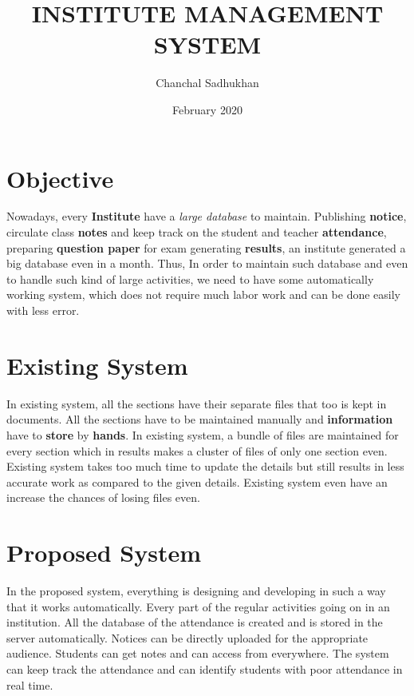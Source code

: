 \documentclass[12pt,a4paper]{article}
\title{INSTITUTE MANAGEMENT SYSTEM}
\author{Chanchal Sadhukhan}
\date{February 2020}
\begin{document}
\maketitle

\section*{Objective}

Nowadays, every \textbf{Institute} have a \emph{large database} to maintain. Publishing \textbf{notice}, circulate class \textbf{notes} and keep track on the student and teacher \textbf{attendance}, preparing \textbf{question paper} for exam generating \textbf{results}, an institute generated a big database even in a month. Thus, In order to maintain such database and even to handle such kind of large activities, we need to have some automatically working system, which does not require much labor work and can be done easily with less error.

\section*{\Large{Existing System}}

In existing system, all the sections have their separate files that too is kept in documents. All the sections have to be maintained manually and \textbf{information} have to \textbf{store} by \textbf{hands}. In existing system, a bundle of files are maintained for every section which in results makes a cluster of files of only one section even. 
Existing system takes too much time to update the details but still results in less accurate work as compared to the given details. Existing system even have an increase the chances of losing files even. 

\section*{Proposed System}

In the proposed system, everything is designing and developing in such a way that it works automatically. Every part of the regular activities going on in an institution.  All the database of the attendance is created and is stored in the server automatically.
Notices can be directly uploaded for the appropriate audience. Students can get notes and can access from everywhere. The system can keep track the attendance and can identify students with poor attendance in real time.
\end{document}
